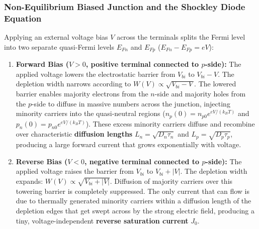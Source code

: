 \documentclass[11pt,a4paper]{article}
\newcommand{\abs}[1]{\left|#1\right|}
\begin{document}
\subsubsection{Non-Equilibrium Biased Junction and the Shockley Diode Equation}
Applying an external voltage bias $V$ across the terminals splits the Fermi level into two separate quasi-Fermi levels $E_{Fn}$ and $E_{Fp}$ ($E_{Fn} - E_{Fp} = e V$):
\begin{enumerate}
    \item \textbf{Forward Bias ($V > 0$, positive terminal connected to $p$-side):}
    The applied voltage lowers the electrostatic barrier from $V_{bi}$ to $V_{bi} - V$. The depletion width narrows according to $W(V) \propto \sqrt{V_{bi} - V}$. The lowered barrier enables majority electrons from the $n$-side and majority holes from the $p$-side to diffuse in massive numbers across the junction, injecting minority carriers into the quasi-neutral regions ($n_p(0) = n_{p0}e^{eV/(k_B T)}$ and $p_n(0) = p_{n0}e^{eV/(k_B T)}$). These excess minority carriers diffuse and recombine over characteristic \textbf{diffusion lengths} $L_n = \sqrt{D_n \tau_n}$ and $L_p = \sqrt{D_p \tau_p}$, producing a large forward current that grows exponentially with voltage.
    \item \textbf{Reverse Bias ($V < 0$, negative terminal connected to $p$-side):}
    The applied voltage raises the barrier from $V_{bi}$ to $V_{bi} + \abs{V}$. The depletion width expands: $W(V) \propto \sqrt{V_{bi} + \abs{V}}$. Diffusion of majority carriers over this towering barrier is completely suppressed. The only current that can flow is due to thermally generated minority carriers within a diffusion length of the depletion edges that get swept across by the strong electric field, producing a tiny, voltage-independent \textbf{reverse saturation current} $J_0$.
\end{enumerate}
\end{document}
